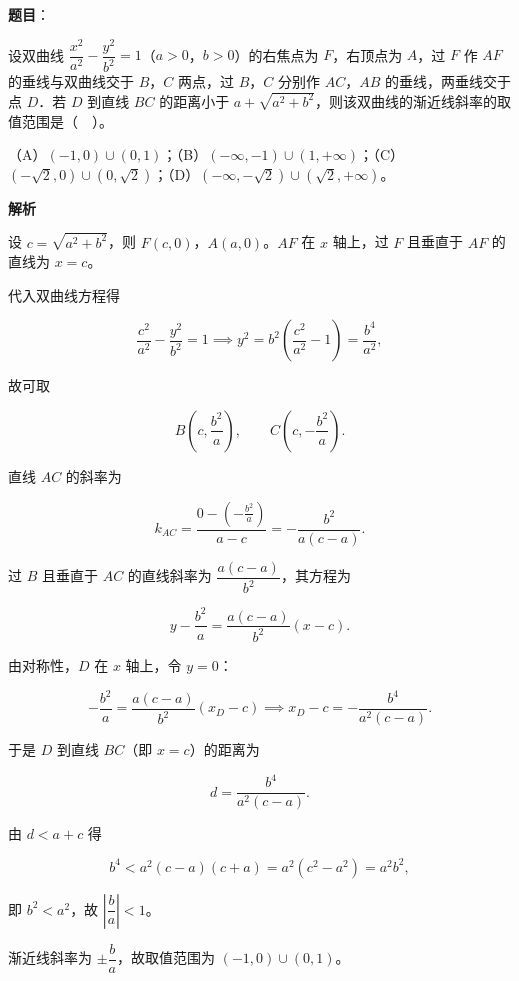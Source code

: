 \begin{answer}

\textbf{题目}：

设双曲线 $\dfrac{x^{2}}{a^{2}}-\dfrac{y^{2}}{b^{2}}=1$（$a>0$，$b>0$）的右焦点为 $F$，右顶点为 $A$，过 $F$ 作 $AF$ 的垂线与双曲线交于 $B$，$C$ 两点，过 $B$，$C$ 分别作 $AC$，$AB$ 的垂线，两垂线交于点 $D$．若 $D$ 到直线 $BC$ 的距离小于 $a+\sqrt{a^{2}+b^{2}}$，则该双曲线的渐近线斜率的取值范围是（　）。

（A）$(-1,0)\cup(0,1)$；（B）$(-\infty,-1)\cup(1,+\infty)$；（C）$(-\sqrt{2},0)\cup(0,\sqrt{2})$；（D）$(-\infty,-\sqrt{2})\cup(\sqrt{2},+\infty)$。

\textbf{解析}

设 $c=\sqrt{a^{2}+b^{2}}$，则 $F(c,0)$，$A(a,0)$。$AF$ 在 $x$ 轴上，过 $F$ 且垂直于 $AF$ 的直线为 $x=c$。

代入双曲线方程得

\nopagebreak[4]
\[
\frac{c^{2}}{a^{2}}-\frac{y^{2}}{b^{2}}=1
\implies y^{2}=b^{2}\left(\frac{c^{2}}{a^{2}}-1\right)=\frac{b^{4}}{a^{2}},
\]

故可取

\nopagebreak[4]
\[
B\left(c,\frac{b^{2}}{a}\right),\qquad C\left(c,-\frac{b^{2}}{a}\right).
\]

直线 $AC$ 的斜率为

\nopagebreak[4]
\[
k_{AC}=\frac{0-\left(-\frac{b^{2}}{a}\right)}{a-c}
=-\frac{b^{2}}{a(c-a)}.
\]

过 $B$ 且垂直于 $AC$ 的直线斜率为 $\dfrac{a(c-a)}{b^{2}}$，其方程为

\nopagebreak[4]
\[
y-\frac{b^{2}}{a}=\frac{a(c-a)}{b^{2}}(x-c).
\]

由对称性，$D$ 在 $x$ 轴上，令 $y=0$：

\nopagebreak[4]
\[
-\frac{b^{2}}{a}=\frac{a(c-a)}{b^{2}}(x_{D}-c)
\implies x_{D}-c=-\frac{b^{4}}{a^{2}(c-a)}.
\]

于是 $D$ 到直线 $BC$（即 $x=c$）的距离为

\nopagebreak[4]
\[
d=\frac{b^{4}}{a^{2}(c-a)}.
\]

由 $d<a+c$ 得

\nopagebreak[4]
\[
b^{4}<a^{2}(c-a)(c+a)=a^{2}(c^{2}-a^{2})=a^{2}b^{2},
\]

即 $b^{2}<a^{2}$，故 $\left|\dfrac{b}{a}\right|<1$。

渐近线斜率为 $\pm\dfrac{b}{a}$，故取值范围为 $(-1,0)\cup(0,1)$。


\end{answer}

